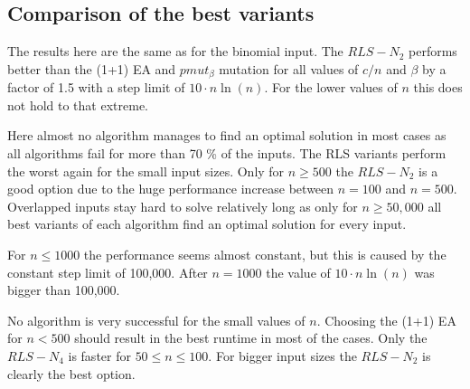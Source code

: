 \subsection{Comparison of the best variants}




The results here are the same as for the binomial input. The $RLS-N_2$ performs better than the (1+1) EA and $pmut_\beta$ mutation for all values of $c/n$ and $\beta$ by a factor of 1.5 with a step limit of $10 \cdot n \ln(n)$. For the lower values of $n$ this does not hold to that extreme.



Here almost no algorithm manages to find an optimal solution in most cases as all algorithms fail for more than 70 \% of the inputs.
The RLS variants perform the worst again for the small input sizes.
Only for $n\ge500$ the $RLS-N_{2}$ is a good option due to the huge performance increase between $n=100$ and $n=500$.
Overlapped inputs stay hard to solve relatively long as only for $n\ge50,000$ all best variants of each algorithm find an optimal solution for every input.



For $n\le1000$ the performance seems almost constant, but this is caused by the constant step limit of 100,000.
After $n=1000$ the value of $10 \cdot n \ln(n)$ was bigger than 100,000.



No algorithm is very successful for the small values of $n$.
Choosing the (1+1) EA for $n<500$ should result in the best runtime in most of the cases.
Only the $RLS-N_4$ is faster for $50\le n \le 100$.
For bigger input sizes the $RLS-N_2$ is clearly the best option.
